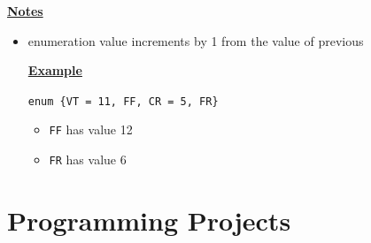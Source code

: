 \documentclass[12pt]{article}
\begin{document}
\begin{enumerate}[1.]
        \bigskip

        \underline{\textbf{Notes}}

        \begin{itemize}
            \item enumeration value increments by 1 from the value of previous

            \bigskip

            \underline{\textbf{Example}}

            \bigskip

            \texttt{enum \{VT = 11, FF, CR = 5, FR\}}

            \begin{itemize}
                \item \texttt{FF} has value 12
                \item \texttt{FR} has value 6
            \end{itemize}
        \end{itemize}
\end{enumerate}

\section{Programming Projects}
\end{document}

